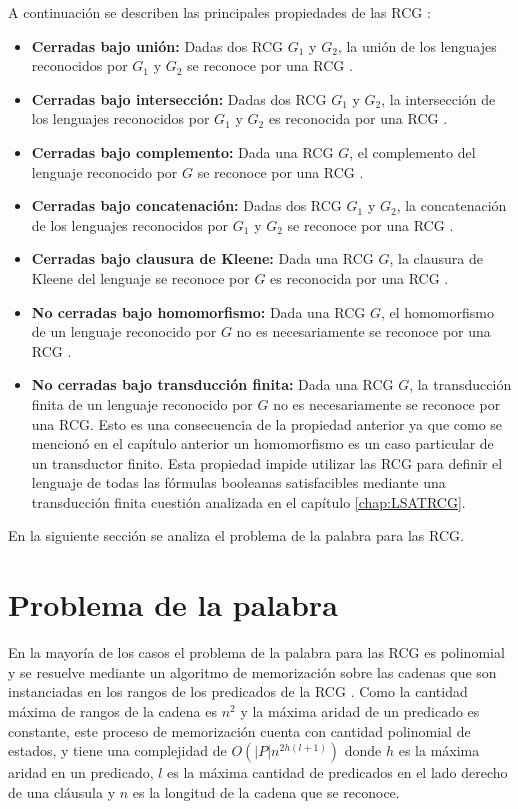 \documentclass[12pt]{article}
\begin{document}
A continuación se describen las principales propiedades de las RCG \cite{propertiesRCGBib}:
\begin{itemize}
    \item \textbf{Cerradas bajo unión:} Dadas dos RCG $G_1$ y $G_2$, la unión de los lenguajes reconocidos por $G_1$ y $G_2$ se reconoce por una RCG \cite{mainRCGBib}.
    \item \textbf{Cerradas bajo intersección:} Dadas dos RCG $G_1$ y $G_2$, la intersección de los lenguajes reconocidos por $G_1$ y $G_2$ es reconocida por una RCG \cite{mainRCGBib}.
    \item \textbf{Cerradas bajo complemento:} Dada una RCG $G$, el complemento del lenguaje reconocido por $G$ se reconoce por una RCG \cite{mainRCGBib}.
    \item \textbf{Cerradas bajo concatenación:} Dadas dos RCG $G_1$ y $G_2$, la concatenación de los lenguajes reconocidos por $G_1$ y $G_2$ se reconoce por una RCG \cite{mainRCGBib}.
    \item \textbf{Cerradas bajo clausura de Kleene:} Dada una RCG $G$, la clausura de Kleene del lenguaje se reconoce por $G$ es reconocida por una RCG \cite{mainRCGBib}.
    \item  \textbf{No cerradas bajo homomorfismo:} Dada una RCG $G$, el homomorfismo de un lenguaje reconocido por $G$ no es necesariamente se reconoce por una RCG \cite{propertiesRCGBib}.
    \item  \textbf{No cerradas bajo transducción finita:} Dada una RCG $G$, la transducción finita de un lenguaje reconocido por $G$ no es necesariamente se reconoce por una RCG.
          Esto es una consecuencia de la propiedad anterior ya que como se mencionó en el capítulo anterior un homomorfismo es un caso particular de un transductor finito.
          Esta propiedad impide utilizar las RCG para definir el lenguaje de todas las fórmulas booleanas satisfacibles
          mediante una transducción finita cuestión analizada en el capítulo \ref{chap:LSATRCG}.
\end{itemize}


En la siguiente sección se analiza el problema de la palabra para las RCG.

\section{Problema de la palabra}

En la mayoría de los casos el problema de la palabra para las RCG es polinomial y se resuelve
mediante un algoritmo de memorización sobre las cadenas que son instanciadas en los rangos de los predicados
de la RCG \cite{mainRCGBib}.  Como la cantidad máxima de rangos de la cadena es $n^2$ y la máxima aridad de un
predicado es constante, este proceso de memorización cuenta con cantidad polinomial de estados, y tiene una
complejidad de $O(|P|n^{2h(l+1)})$ donde $h$ es la máxima aridad en un predicado, $l$ es la máxima cantidad
de predicados en el lado derecho de una cláusula y $n$ es la longitud de la cadena que se reconoce.
\end{document}
